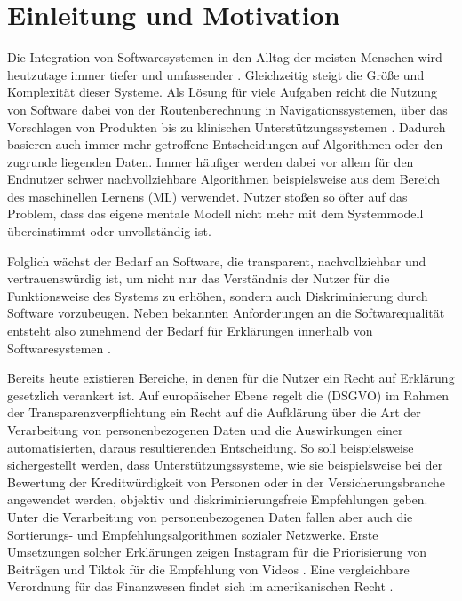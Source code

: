 \chapter{Einleitung und Motivation}

Die Integration von Softwaresystemen in den Alltag der meisten Menschen wird heutzutage immer tiefer und umfassender \cite{carvalho2020developers}.  Gleichzeitig steigt die Größe und Komplexität dieser Systeme. Als Lösung für viele Aufgaben reicht die Nutzung von Software dabei von der Routenberechnung in Navigationssystemen, über das Vorschlagen von Produkten bis zu klinischen Unterstützungssystemen \cite{chazette2020explainability, tintarev2015explaining, cypko2017guide}. Dadurch basieren auch immer mehr getroffene Entscheidungen auf Algorithmen oder den zugrunde liegenden Daten. Immer häufiger werden dabei vor allem für den Endnutzer schwer nachvollziehbare Algorithmen beispielsweise aus dem Bereich des maschinellen Lernens (ML) verwendet. Nutzer stoßen so öfter auf das Problem, dass das eigene mentale Modell nicht mehr mit dem Systemmodell übereinstimmt oder unvollständig ist.

Folglich wächst der Bedarf an Software, die transparent, nachvollziehbar und vertrauenswürdig ist, um nicht nur das Verständnis der Nutzer für die Funktionsweise des Systems zu erhöhen, sondern auch Diskriminierung durch Software vorzubeugen. Neben bekannten Anforderungen an die Softwarequalität \cite{international2011iso} entsteht also zunehmend der Bedarf für Erklärungen innerhalb von Softwaresystemen \cite{chazette_end-users_nodate}.

Bereits heute existieren Bereiche, in denen für die Nutzer ein \glqq Recht auf Erklärung\grqq{} gesetzlich verankert ist. Auf europäischer Ebene regelt die  (DSGVO) \cite{eu_verordnung_2016} im Rahmen der Transparenzverpflichtung ein Recht auf die Aufklärung über die Art der Verarbeitung von personenbezogenen Daten und die Auswirkungen einer automatisierten, daraus resultierenden Entscheidung. So soll beispielsweise sichergestellt werden, dass Unterstützungssysteme, wie sie beispielsweise bei der Bewertung der Kreditwürdigkeit von Personen oder in der Versicherungsbranche angewendet werden, objektiv und diskriminierungsfreie Empfehlungen geben. Unter die Verarbeitung von personenbezogenen Daten fallen aber auch die Sortierungs- und Empfehlungsalgorithmen sozialer Netzwerke. Erste Umsetzungen solcher Erklärungen zeigen Instagram für die Priorisierung von Beiträgen und Tiktok für die Empfehlung von Videos \cite{mosseri_shedding_2021,tiktok_technology_limited_how_2021}. Eine vergleichbare Verordnung für das Finanzwesen findet sich im amerikanischen Recht \cite{cfpb_regulation_2018}.

